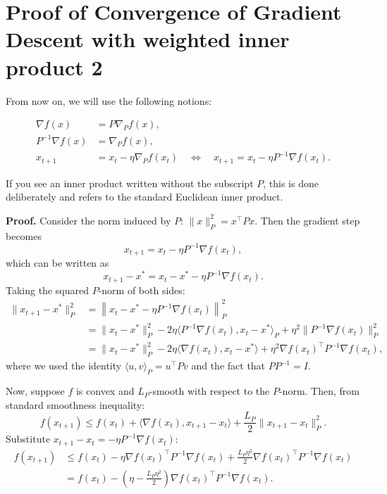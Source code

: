 \documentclass{article}
\begin{document}


\section*{Proof of Convergence of Gradient Descent with weighted inner product 2}

From now on, we will use the following notions:

\begin{align*}
    \nabla f(x) &= P \nabla_P f(x), \\
    P^{-1} \nabla f(x) &= \nabla_P f(x), \\
    x_{t+1} &= x_t - \eta \nabla_P f(x_t) 
    \quad \Leftrightarrow \quad 
    x_{t+1} = x_t - \eta P^{-1} \nabla f(x_t).
\end{align*}

If you see an inner product written without the subscript \(P\), this is done deliberately and refers to the standard Euclidean inner product. 

\textbf{Proof.} Consider the norm induced by \(P\): \( \|x\|_P^2 = x^\top P x \). Then the gradient step becomes
\[
x_{t+1} = x_t - \eta P^{-1} \nabla f(x_t),
\]
which can be written as
\[
x_{t+1} - x^* = x_t - x^* - \eta P^{-1} \nabla f(x_t).
\]
Taking the squared \(P\)-norm of both sides:
\begin{align*}
\|x_{t+1} - x^*\|_P^2 
&= \left\|x_t - x^* - \eta P^{-1} \nabla f(x_t)\right\|_P^2 \\
&= \|x_t - x^*\|_P^2 - 2\eta \langle P^{-1} \nabla f(x_t), x_t - x^* \rangle_P + \eta^2 \|P^{-1} \nabla f(x_t)\|_P^2 \\
&= \|x_t - x^*\|_P^2 - 2\eta \langle \nabla f(x_t), x_t - x^* \rangle + \eta^2 \nabla f(x_t)^\top P^{-1} \nabla f(x_t),
\end{align*}
where we used the identity \(\langle u, v \rangle_P = u^\top P v\) and the fact that \(P P^{-1} = I\).

Now, suppose \(f\) is convex and \(L_P\)-smooth with respect to the \(P\)-norm. Then, from standard smoothness inequality:
\[
f(x_{t+1}) \le f(x_t) + \langle \nabla f(x_t), x_{t+1} - x_t \rangle + \frac{L_P}{2} \|x_{t+1} - x_t\|_P^2. \tag{?}
\]
Substitute \(x_{t+1} - x_t = -\eta P^{-1} \nabla f(x_t)\):
\begin{align*}
f(x_{t+1}) 
&\le f(x_t) - \eta \nabla f(x_t)^\top P^{-1} \nabla f(x_t) + \frac{L_P \eta^2}{2} \nabla f(x_t)^\top P^{-1} \nabla f(x_t) \\
&= f(x_t) - \left( \eta - \frac{L_P \eta^2}{2} \right) \nabla f(x_t)^\top P^{-1} \nabla f(x_t).
\end{align*}
\end{document}
